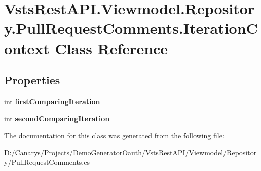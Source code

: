 \hypertarget{class_vsts_rest_a_p_i_1_1_viewmodel_1_1_repository_1_1_pull_request_comments_1_1_iteration_context}{}\section{Vsts\+Rest\+A\+P\+I.\+Viewmodel.\+Repository.\+Pull\+Request\+Comments.\+Iteration\+Context Class Reference}
\label{class_vsts_rest_a_p_i_1_1_viewmodel_1_1_repository_1_1_pull_request_comments_1_1_iteration_context}
\subsection*{Properties}
\begin{DoxyCompactItemize}
\item 
\mbox{\label{class_vsts_rest_a_p_i_1_1_viewmodel_1_1_repository_1_1_pull_request_comments_1_1_iteration_context_add36da611f6eaafc7c1b921f2cb1a20f}} 
int {\bfseries first\+Comparing\+Iteration}
\item 
\mbox{\label{class_vsts_rest_a_p_i_1_1_viewmodel_1_1_repository_1_1_pull_request_comments_1_1_iteration_context_afa0e2a243d4bc0424938af97ce9589d0}} 
int {\bfseries second\+Comparing\+Iteration}
\end{DoxyCompactItemize}


The documentation for this class was generated from the following file\+:\begin{DoxyCompactItemize}
\item 
D\+:/\+Canarys/\+Projects/\+Demo\+Generator\+Oauth/\+Vsts\+Rest\+A\+P\+I/\+Viewmodel/\+Repository/Pull\+Request\+Comments.\+cs\end{DoxyCompactItemize}
